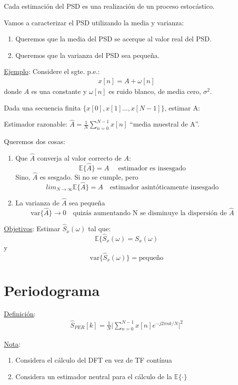 Cada estimación del PSD es una realización de un proceso estocástico.\\
\par Vamos a caracterizar el PSD utilizando la media y varianza:
\begin{enumerate}
    \item Queremos que la media del PSD se acerque al valor real del PSD.
    \item Queremos que la varianza del PSD sea pequeña.
\end{enumerate}

\underline{Ejemplo}: Considere el sgte. p.e.:
\begin{align*}
    x[n]=A+\omega[n]
\end{align*}
donde $A$ es una constante y $\omega[n]$ es ruido blanco, de media cero, $\sigma^2$.\\
\par Dada una secuencia finita $\{x[0],x[1]...,x[N-1]\}$, estimar A:\\
\par Estimador razonable: $\hat{A}=\frac{1}{N}\sum_{n=0}^{N-1}x[n]$ ``media muestral de A''.\\
\par Queremos dos cosas:
\begin{enumerate}
    \item Que $\hat{A}$ converja al valor correcto de $A$: 
    $$\mathbb{E}\{\hat{A}\}=A \quad \text{ estimador es insesgado}$$
    Sino, $\hat{A}$ es sesgado. Si no se cumple, pero $$lim_{N\to\infty} \mathbb{E}\{\hat{A}\}=A \quad \text{estimador asintóticamente insesgado} $$
    \item La varianza de $\hat{A}$ sea pequeña
    $$\text{var}\{\hat{A}\}\to 0 \quad \text{quizás aumentando N se disminuye la dispersión de }\hat{A}$$
\end{enumerate}

\underline{Objetivos}: Estimar $\hat{S}_x(\omega)$ tal que:
$$\mathbb{E}\{\hat{S}_x(\omega)=S_x(\omega) $$ y 
$$\text{var}\{\hat{S}_x(\omega)\}=\text{pequeño} $$ 

\section{Periodograma}
\underline{Definición}: 
\begin{align*}
    \hat{S}_{PER}[k] =\frac{1}{N}\bigg|\sum_{n=0}^{N-1}x[n]e^{-j2\pi nk/N}\bigg|^2
\end{align*}

\underline{Nota}: 
\begin{enumerate}
    \item Considera el cálculo del DFT en vez de TF contínua
    \item Considera un estimador neutral para el cálculo de la $\mathbb{E}\{\cdot \}$
\end{enumerate}

